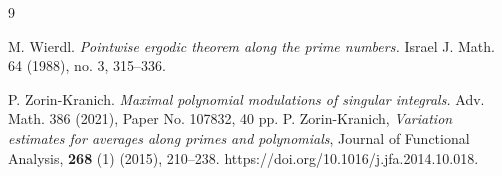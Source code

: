 \documentclass[12pt]{amsart}
\numberwithin{equation}{section}
\theoremstyle{definition}
\begin{document}
\begin{thebibliography}{9}

M. Wierdl.
\emph{Pointwise ergodic theorem along the prime numbers.}
Israel J. Math. 64 (1988), no. 3, 315–336.



P. Zorin-Kranich.
\emph{Maximal polynomial modulations of singular integrals.}
Adv. Math. 386 (2021), Paper No. 107832, 40 pp.
P. Zorin-Kranich,
\textit{Variation estimates for averages along primes and polynomials},
Journal of Functional Analysis,
\textbf{268} (1) (2015), 210--238.
https://doi.org/10.1016/j.jfa.2014.10.018.

\end{thebibliography}
\end{document}
